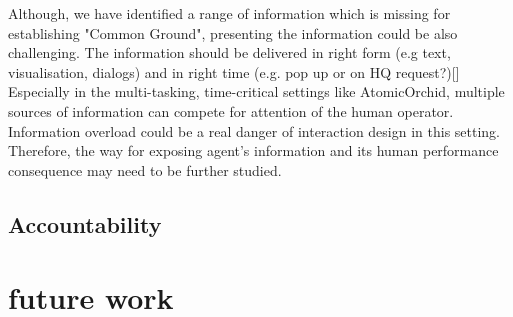 Although, we have identified a range of information which is missing for establishing "Common Ground", presenting the information could be also challenging. The information should be delivered in right form (e.g text, visualisation, dialogs) and in right time (e.g. pop up or on HQ request?)[] Especially in the multi-tasking, time-critical settings like AtomicOrchid, multiple sources of information can compete for attention of the human operator. Information overload could be a real danger of interaction design in this setting. Therefore, the  way for exposing agent's information and its human performance consequence may need to be further studied.   \\


\subsection{Accountability}



\section{future work}


